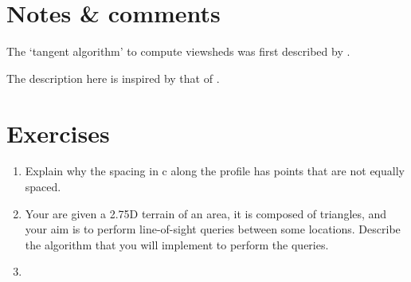 %
\section{Notes \& comments}

The `tangent algorithm' to compute viewsheds was first described by \citet{Blelloch90}.

The description here is inspired by that of \citet{DeFloriani99-1}.


%
\section{Exercises}

\begin{enumerate}
  \item Explain why the spacing in c along the profile has points that are not equally spaced.
  \item Your are given a 2.75D terrain of an area, it is composed of triangles, and your aim is to perform line-of-sight queries between some locations. Describe the algorithm that you will implement to perform the queries.
  \item 
\end{enumerate}
